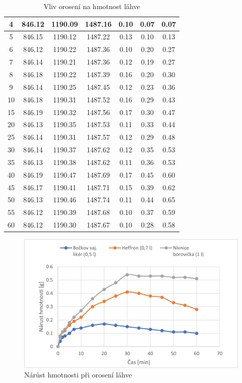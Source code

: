 \begin{table}[H]
\begin{tabular}{|c|c|c|c||c|c|c|}
    4  & 846.12 & 1190.09 & 1487.16 & 0.10 & 0.07 & 0.07 \\ \hline
    5  & 846.15 & 1190.12 & 1487.22 & 0.13 & 0.10 & 0.13 \\ \hline
    6  & 846.12 & 1190.22 & 1487.36 & 0.10 & 0.20 & 0.27 \\ \hline
    7  & 846.14 & 1190.21 & 1487.36 & 0.12 & 0.19 & 0.27 \\ \hline
    8  & 846.18 & 1190.22 & 1487.39 & 0.16 & 0.20 & 0.30 \\ \hline
    9  & 846.14 & 1190.25 & 1487.45 & 0.12 & 0.23 & 0.36 \\ \hline
    10 & 846.18 & 1190.31 & 1487.52 & 0.16 & 0.29 & 0.43 \\ \hline
    15 & 846.19 & 1190.32 & 1487.56 & 0.17 & 0.30 & 0.47 \\ \hline
    20 & 846.13 & 1190.35 & 1487.53 & 0.11 & 0.33 & 0.44 \\ \hline
    25 & 846.14 & 1190.31 & 1487.57 & 0.12 & 0.29 & 0.48 \\ \hline
    30 & 846.14 & 1190.37 & 1487.62 & 0.12 & 0.35 & 0.53 \\ \hline
    35 & 846.13 & 1190.38 & 1487.62 & 0.11 & 0.36 & 0.53 \\ \hline
    40 & 846.19 & 1190.47 & 1487.69 & 0.17 & 0.45 & 0.60 \\ \hline
    45 & 846.17 & 1190.41 & 1487.71 & 0.15 & 0.39 & 0.62 \\ \hline
    50 & 846.13 & 1190.46 & 1487.74 & 0.11 & 0.44 & 0.65 \\ \hline
    55 & 846.12 & 1190.39 & 1487.68 & 0.10 & 0.37 & 0.59 \\ \hline
    60 & 846.12 & 1190.30 & 1487.67 & 0.10 & 0.28 & 0.58 \\ \hline
    \end{tabular}
    \caption{Vliv orosení na hmotnost láhve}
    \label{tab:measurement_data}
\end{table}

\begin{figure}[H]
    \begin{center}
        \includegraphics[scale=1.2]{obrazky/orosení.png}
    \end{center}
    \caption{Nárůst hmotnosti při orosení láhve}
\end{figure}

